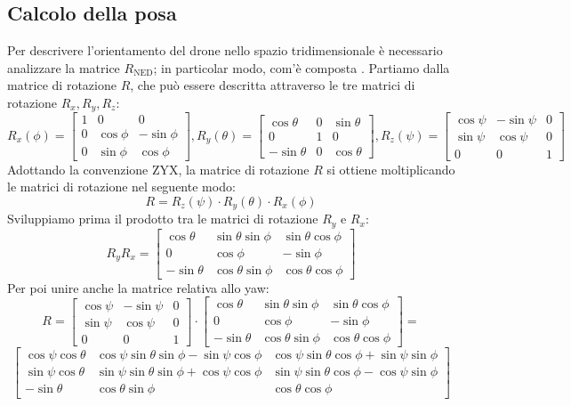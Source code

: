 \subsection{Calcolo della posa}
\label{sez:archi:vo:posa}
Per descrivere l'orientamento del drone nello spazio tridimensionale è necessario analizzare la matrice $R_\mathrm{NED}$; in particolar modo, com'è composta \cite{kriz2006euler}. Partiamo dalla matrice di rotazione $R$, che può essere descritta attraverso le tre matrici di rotazione $R_x, R_y, R_z$:
\[
R_x(\phi)=
\begin{bmatrix}
	1 & 0 & 0\\
	0 & \cos\phi & -\sin\phi\\
	0  & \sin\phi & \cos\phi
\end{bmatrix},
R_y(\theta)=
\begin{bmatrix}
	\cos\theta & 0 & \sin\theta\\
	0 & 1 & 0\\
	-\sin\theta & 0 & \cos\theta
\end{bmatrix},
R_z(\psi)=
\begin{bmatrix}
	\cos\psi & -\sin\psi & 0\\
	\sin\psi & \cos\psi & 0\\
	0 & 0 & 1
\end{bmatrix}
\]
Adottando la convenzione ZYX, la matrice di rotazione $R$ si ottiene moltiplicando le matrici di rotazione nel seguente modo:
\[
R=R_z(\psi) \cdot R_y(\theta) \cdot R_x(\phi)
\]
Sviluppiamo prima il prodotto tra le matrici di rotazione $R_y$ e $R_x$:
\[
R_yR_x=
\begin{bmatrix}
	\cos\theta & \sin\theta\sin\phi & \sin\theta\cos\phi\\
	0 & \cos\phi & -\sin\phi\\
	-\sin\theta & \cos\theta\sin\phi & \cos\theta\cos\phi
\end{bmatrix}
\]
Per poi unire anche la matrice relativa allo yaw:
\[
R=
\begin{bmatrix}
	\cos\psi & -\sin\psi & 0\\
	\sin\psi & \cos\psi & 0\\
	0 & 0 & 1
\end{bmatrix}
\cdot
\begin{bmatrix}
	\cos\theta & \sin\theta\sin\phi & \sin\theta\cos\phi\\
	0 & \cos\phi & -\sin\phi\\
	-\sin\theta & \cos\theta\sin\phi & \cos\theta\cos\phi
\end{bmatrix}=
\]
\[
\begin{bmatrix}
	\cos\psi\cos\theta &
	\cos\psi\sin\theta\sin\phi-\sin\psi\cos\phi &
	\cos\psi\sin\theta\cos\phi+\sin\psi\sin\phi\\
	\sin\psi\cos\theta &
	\sin\psi\sin\theta\sin\phi+\cos\psi\cos\phi &
	\sin\psi\sin\theta\cos\phi-\cos\psi\sin\phi\\
	-\sin\theta &
	\cos\theta\sin\phi &
	\cos\theta\cos\phi
\end{bmatrix}
\]
